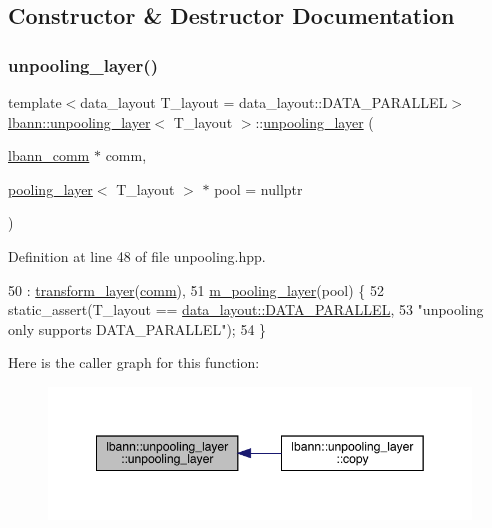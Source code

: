 \subsection{Constructor \& Destructor Documentation}
\mbox{\label{classlbann_1_1unpooling__layer_a40055be5b45cb444581987395befc09a}} 
\subsubsection{\texorpdfstring{unpooling\+\_\+layer()}{unpooling\_layer()}}
{\footnotesize\ttfamily template$<$data\+\_\+layout T\+\_\+layout = data\+\_\+layout\+::\+D\+A\+T\+A\+\_\+\+P\+A\+R\+A\+L\+L\+EL$>$ \\
\hyperlink{classlbann_1_1unpooling__layer}{lbann\+::unpooling\+\_\+layer}$<$ T\+\_\+layout $>$\+::\hyperlink{classlbann_1_1unpooling__layer}{unpooling\+\_\+layer} (\begin{DoxyParamCaption}\item[{\hyperlink{classlbann_1_1lbann__comm}{lbann\+\_\+comm} $\ast$}]{comm,  }\item[{\hyperlink{classlbann_1_1pooling__layer}{pooling\+\_\+layer}$<$ T\+\_\+layout $>$ $\ast$}]{pool = {\ttfamily nullptr} }\end{DoxyParamCaption})\hspace{0.3cm}{\ttfamily [inline]}}



Definition at line 48 of file unpooling.\+hpp.


\begin{DoxyCode}
50     : \hyperlink{classlbann_1_1transform__layer_a4b72501e0f4d0745c8b13c5331055e65}{transform\_layer}(\hyperlink{file__io_8cpp_ab048c6f9fcbcfaa57ce68b00263dbebe}{comm}),
51       \hyperlink{classlbann_1_1unpooling__layer_ab15a8b0680685f80c7d995e617e97a9a}{m\_pooling\_layer}(pool) \{
52     static\_assert(T\_layout == \hyperlink{base_8hpp_a786677cbfb3f5677b4d84f3056eb08dba37d2a3465f7cbf4ab60f4e79944d0638}{data\_layout::DATA\_PARALLEL},
53                   \textcolor{stringliteral}{"unpooling only supports DATA\_PARALLEL"});
54   \}
\end{DoxyCode}
Here is the caller graph for this function\+:\nopagebreak
\begin{figure}[H]
\begin{center}
\leavevmode
\includegraphics[width=349pt]{classlbann_1_1unpooling__layer_a40055be5b45cb444581987395befc09a_icgraph}
\end{center}
\end{figure}



